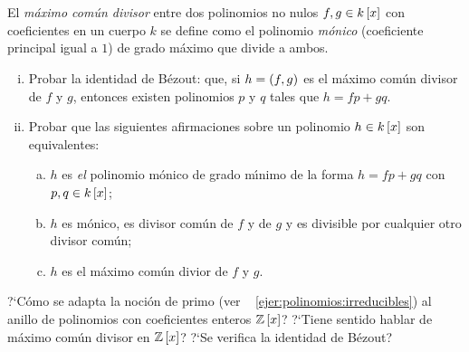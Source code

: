 \begin{ejerPolinomios}\label{ejer:polinomios;mcd}
	El \emph{m\'aximo com\'un divisor} entre dos polinomios no nulos
	$f,g\in{k}\left[x\right]$ con coeficientes en un cuerpo $k$ se define
	como el polinomio \emph{m\'onico} (coeficiente principal igual a $1$)
	de grado m\'aximo que divide a ambos.
	\begin{enumerate}[(i)]
		\item\label{ejer:polinomios:mcd:bezout}
			Probar la identidad de B\'ezout: que, si $h=\left({f,g}\right)_{}$
			es el m\'aximo com\'un divisor de $f$ y $g$, entonces
			existen polinomios $p$ y $q$ tales que $h=fp+gq$.
		\item\label{ejer:polinomios:mcd:equivalencias}
			Probar que las siguientes afirmaciones sobre un
			polinomio $h\in{k}\left[x\right]$ son equivalentes:
			\begin{enumerate}[(a)]
				\item\label{ejer:polinomios:mcd:a}
					$h$ es \emph{el} polinomio m\'onico
					de grado m\'{\i}nimo de la forma
					$h=fp+gq$ con $p,q\in{k}\left[x\right]$;
				\item\label{ejer:polinomios:mcd:b}
					$h$ es m\'onico, es divisor com\'un
					de $f$ y de $g$ y es divisible por
					cualquier otro divisor com\'un;
				\item\label{ejer:polinomios:mcd:c}
					$h$ es el m\'aximo com\'un divior
					de $f$ y $g$.
			\end{enumerate}
	\end{enumerate}
\end{ejerPolinomios}

\begin{ejerPolinomios}\label{ejer:polinomios:enteros}
	?`C\'omo se adapta la noci\'on de primo (ver \ejername~%
	\ref{ejer:polinomios:irreducibles}) al anillo de polinomios con
	coeficientes enteros ${\mathbb{Z}}\left[x\right]$?
	?`Tiene sentido hablar de m\'aximo com\'un divisor en
	${\mathbb{Z}}\left[x\right]$? ?`Se verifica la identidad de B\'ezout?
\end{ejerPolinomios}

